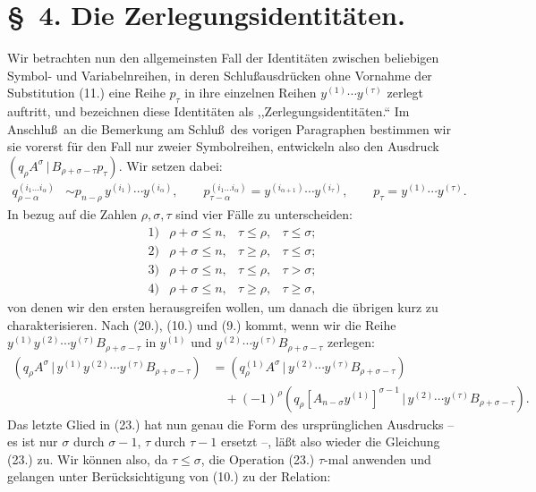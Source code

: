 \documentclass[11pt]{article}
\providecommand{\pair}[2]{(#1\,|\,#2)}
\begin{document}
\section*{\S\ 4. Die Zerlegungsidentit\"aten.}
Wir betrachten nun den allgemeinsten Fall der Identit\"aten zwischen beliebigen Symbol- und Variabelnreihen, in deren Schlu\ss ausdr\"ucken ohne Vornahme der Substitution (11.) eine Reihe $p_\tau$ in ihre einzelnen Reihen $y^{(1)}\cdots y^{(\tau)}$ zerlegt auftritt, und bezeichnen diese Identit\"aten als ,,Zerlegungsidentit\"aten.`` Im Anschlu\ss\ an die Bemerkung am Schlu\ss\ des vorigen Paragraphen bestimmen wir sie vorerst f\"ur den Fall nur zweier Symbolreihen, entwickeln also den Ausdruck $\pair{q_\rho A^\sigma}{B_{\rho+\sigma-\tau}p_\tau}$. Wir setzen dabei:
\begin{equation}
\begin{aligned}
q_{\rho-\alpha}^{(i_1\ldots i_\alpha)}&\sim p_{n-\rho}\,y^{(i_1)}\cdots y^{(i_\alpha)},\qquad
p_{\tau-\alpha}^{(i_1\ldots i_\alpha)}=y^{(i_{\alpha+1})}\cdots y^{(i_\tau)},\qquad
p_\tau=y^{(1)}\cdots y^{(\tau)}.
\end{aligned}
\tag{22}
\end{equation}
In bezug auf die Zahlen $\rho,\sigma,\tau$ sind vier F\"alle zu unterscheiden:
\[
\begin{array}{llll}
1)&\rho+\sigma\le n,& \tau\le\rho,& \tau\le\sigma;\\[2pt]
2)&\rho+\sigma\le n,& \tau\ge\rho,& \tau\le\sigma;\\[2pt]
3)&\rho+\sigma\le n,& \tau\le\rho,& \tau>\sigma;\\[2pt]
4)&\rho+\sigma\le n,& \tau\ge\rho,& \tau\ge\sigma,
\end{array}
\]
von denen wir den ersten herausgreifen wollen, um danach die \"ubrigen kurz zu charakterisieren. Nach (20.), (10.) und (9.) kommt, wenn wir die Reihe $y^{(1)}y^{(2)}\cdots y^{(\tau)}B_{\rho+\sigma-\tau}$ in $y^{(1)}$ und $y^{(2)}\cdots y^{(\tau)}B_{\rho+\sigma-\tau}$ zerlegen:
\begin{equation}
\begin{aligned}
\pair{q_\rho A^\sigma}{y^{(1)}y^{(2)}\cdots y^{(\tau)}B_{\rho+\sigma-\tau}}
&=\pair{q_\rho^{(1)}A^\sigma}{y^{(2)}\cdots y^{(\tau)}B_{\rho+\sigma-\tau}}\\
&\quad+(-1)^\rho\pair{q_\rho[A_{n-\sigma}y^{(1)}]^{\sigma-1}}{y^{(2)}\cdots y^{(\tau)}B_{\rho+\sigma-\tau}}.
\end{aligned}
\tag{23}
\end{equation}
Das letzte Glied in (23.) hat nun genau die Form des urspr\"unglichen Ausdrucks -- es ist nur $\sigma$ durch $\sigma-1$, $\tau$ durch $\tau-1$ ersetzt --, l\"a\ss t also wieder die Gleichung (23.) zu. Wir k\"onnen also, da $\tau\le\sigma$, die Operation (23.) $\tau$-mal anwenden und gelangen unter Ber\"ucksichtigung von (10.) zu der Relation:
\end{document}
